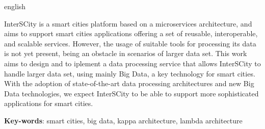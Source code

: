\begin{resumo}[Abstract]
 \begin{otherlanguage*}{english}

     InterSCity is a smart cities platform based on a microservices
     architecture, and aims to support smart cities applications offering a
     set of reusable, interoperable, and scalable services. However, the usage
     of suitable tools for processing its data is not yet present, being an
     obstacle in scenarios of larger data set. This work aims to design and to
     iplement a data processing service that allows InterSCity to handle larger
     data set, using mainly Big Data, a key technology for smart cities. With
     the adoption of state-of-the-art data processing architectures and new
     Big Data technologies, we expect InterSCity to be able to support
     more sophisticated applications for smart cities.

   \vspace{\onelineskip}
 
   \noindent 
   \textbf{Key-words}: smart cities, big data, kappa architecture, lambda architecture
 \end{otherlanguage*}
\end{resumo}
